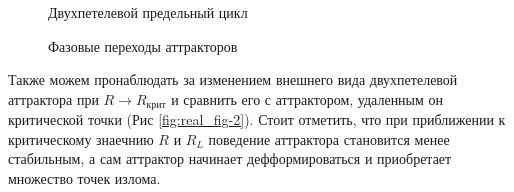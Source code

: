 \documentclass[12pt]{article}
\begin{document}
\begin{figure}[H]
\begin{minipage}[h]{0.47\linewidth}
	\end{minipage}
	\vfill
	\begin{minipage}[h]{0.47\linewidth}
	 Двухпетелевой предельный цикл
	\end{minipage}
	\label{fig:real_fig-1}
	\caption{Фазовые переходы аттракторов}
\end{figure}

Также можем пронаблюдать за изменением внешнего вида двухпетелевой аттрактора при $R \rightarrow R_{\text{крит}}$ и сравнить его с аттрактором, удаленным он критической точки (Рис \ref{fig:real_fig-2}). 
Стоит отметить, что при приближении к критическому знаечнию $R$ и $R_L$ поведение аттрактора становится менее стабильным, а сам аттрактор начинает дефформироваться и приобретает множество точек излома.
\end{document}
